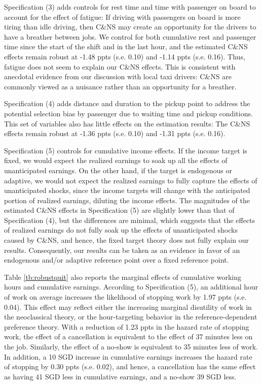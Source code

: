 \documentclass[reviewmode,AEJ]{AEA}
\begin{document}
Specification (3) adds controls for rest time and time with passenger on board to account for the effect of fatigue: If driving with passengers on board is more tiring than idle driving, then C\&NS may create an opportunity for the drivers to have a breather between jobs. We control for both cumulative rest and passenger time since the start of the shift and in the last hour, and the estimated C\&NS effects remain robust at -1.48 ppts (s.e. 0.10) and -1.14 ppts (s.e. 0.16). Thus, fatigue does not seem to explain our C\&NS effects. This is consistent with anecdotal evidence from our discussion with local taxi drivers: C\&NS are commonly viewed as a nuisance rather than an opportunity for a breather.

Specification (4) adds distance and duration to the pickup point to address the potential selection bias by passenger due to waiting time and pickup conditions. This set of variables also has little effects on the estimation results: The C\&NS effects remain robust at -1.36 ppts (s.e. 0.10) and -1.31 ppts (s.e. 0.16).

Specification (5) controls for cumulative income effects. If the income target is fixed, we would expect the realized earnings to soak up all the effects of unanticipated earnings. On the other hand, if the target is endogenous or adaptive, we would not expect the realized earnings to fully capture the effects of unanticipated shocks, since the income targets will change with the anticipated portion of realized earnings, diluting the income effects. The magnitudes of the estimated C\&NS effects in Specification (5) are slightly lower than that of Specification (4), but the differences 
are minimal, which suggests that the effects of realized earnings do not fully soak up the effects of unanticipated shocks caused by C\&NS, and hence, the fixed target theory does not fully explain our results. Consequently, our results can be taken as an evidence in favor of an endogenous and/or adaptive reference point over a fixed reference point. 


Table \ref{tb:robustquit} also reports the marginal effects of cumulative working hours and cumulative earnings. According to Specification (5), an additional hour of work on average increases the likelihood of stopping work by 1.97 ppts (s.e. 0.04). This effect may reflect either the increasing marginal disutility of work in the neoclassical theory, or the hour-targeting behavior in the reference-dependent preference theory. With a reduction of 1.23 ppts in the hazard rate of stopping work, the effect of a cancellation is equivalent to the effect of 37 minutes less on the job. Similarly, the effect of a no-show is equivalent to 35 minutes less of work. In addition, a 10 SGD increase in cumulative earnings increases the hazard rate of stopping by 0.30 ppts (s.e. 0.02), and hence, a cancellation has the same effect as having 41 SGD less in cumulative earnings, and a no-show 39 SGD less.
\end{document}
